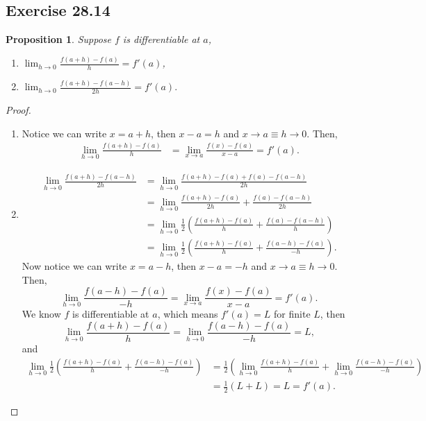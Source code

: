 \documentclass{article}
\newtheorem{proposition}[thm]{Proposition}
\begin{document}
\newpage
\subsection*{Exercise 28.14}
\begin{proposition}
    Suppose $f$ is differentiable at $a$,
    \begin{enumerate}[label=\textbf{(\alph*)}]
        \item $\lim_{h\to0}\frac{f(a+h)-f(a)}{h}=f'(a)$,
        \item $\lim_{h\to0}\frac{f(a+h)-f(a-h)}{2h}=f'(a).$
    \end{enumerate}
\end{proposition}
\begin{proof}\indent
    \begin{enumerate}[label=\textbf{(\alph*)}]
        \item Notice we can write $x=a+h$, then $x-a=h$ and $x\to a\equiv h\to 0$. Then,
        \begin{align*}
            \lim_{h\to0}\frac{f(a+h)-f(a)}{h} & = \lim_{x\to a}\frac{f(x)-f(a)}{x-a} = f'(a).
        \end{align*}

        \item
        \begin{align*}
            \lim_{h\to0}\frac{f(a+h)-f(a-h)}{2h} & = 
            \lim_{h\to0}\frac{f(a+h)-f(a)+f(a)-f(a-h)}{2h} \\
            & = \lim_{h\to0}\frac{f(a+h)-f(a)}{2h} + \frac{f(a)-f(a-h)}{2h} \\
            & = \lim_{h\to0}\frac{1}{2}\left(\frac{f(a+h)-f(a)}{h} + \frac{f(a)-f(a-h)}{h}\right) \\
            & = \lim_{h\to0}\frac{1}{2}\left(\frac{f(a+h)-f(a)}{h} + \frac{f(a-h)-f(a)}{-h}\right).
        \end{align*}
        Now notice we can write $x=a-h$, then $x-a=-h$ and $x\to a\equiv h\to 0$. Then,
        $$\lim_{h\to0}\frac{f(a-h)-f(a)}{-h} = \lim_{x\to a}\frac{f(x)-f(a)}{x-a} = f'(a).$$
        We know $f$ is differentiable at $a$, which means $f'(a)=L$ for finite $L$, then 
        $$\lim_{h\to0}\frac{f(a+h)-f(a)}{h} = \lim_{h\to0}\frac{f(a-h)-f(a)}{-h} = L,$$
        and \begin{align*}
            \lim_{h\to0}\frac{1}{2}\left(\frac{f(a+h)-f(a)}{h} + \frac{f(a-h)-f(a)}{-h}\right) & =
            \frac{1}{2}\left(\lim_{h\to0}\frac{f(a+h)-f(a)}{h} + \lim_{h\to0}\frac{f(a-h)-f(a)}{-h}\right) \\
            & = \frac{1}{2}\left(L+L\right) = L = f'(a).
        \end{align*}
    \end{enumerate}
\end{proof}
\end{document}
